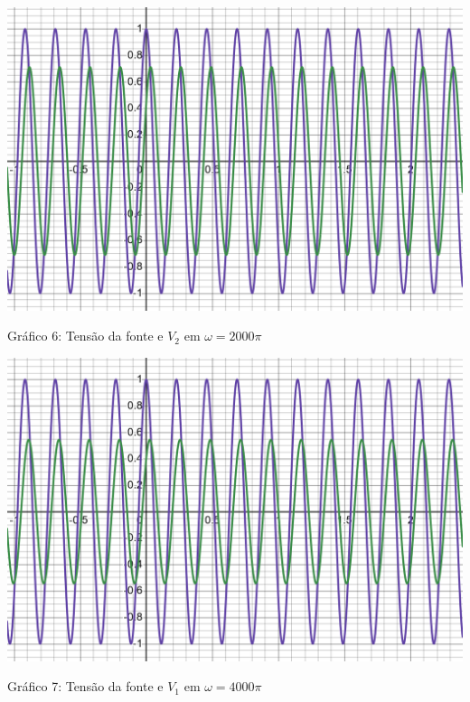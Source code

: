 \documentclass[a4 paper]{article}
\begin{document}
\vspace{30pt}
\begin{table}[h]
\centering
\includegraphics[scale=0.25]{rgadicoas/grafico7}
\end{table}

\begin{center}
Gráfico 6: Tensão da fonte e $V_2$ em $\omega =2000\pi$
\end{center}

\newpage
\begin{table}[h]
\centering
\includegraphics[scale=0.25]{rgadicoas/grafico4}
\end{table}

\begin{center}
Gráfico 7: Tensão da fonte e $V_1$ em $\omega =4000\pi$
\end{center}
\end{document}
